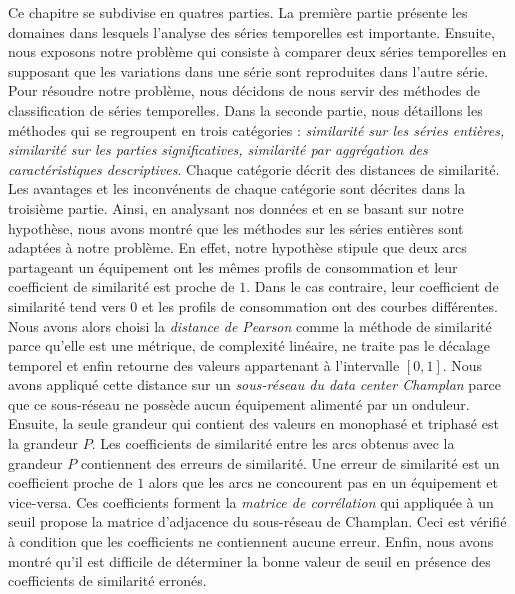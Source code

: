 Ce chapitre se subdivise en quatres parties.
La premi\`ere partie pr\'esente les domaines dans lesquels l'analyse des s\'eries temporelles est importante. Ensuite, nous exposons notre probl\`eme qui consiste \`a comparer deux s\'eries temporelles en supposant que les variations dans une s\'erie sont reproduites dans l'autre s\'erie.
Pour r\'esoudre notre probl\`eme, nous d\'ecidons de nous servir des m\'ethodes de classification de s\'eries temporelles.
Dans la seconde partie, nous d\'etaillons les m\'ethodes qui se regroupent en trois cat\'egories :
{\em similarit\'e sur les s\'eries enti\`eres, similarit\'e sur les parties significatives, similarit\'e par aggr\'egation des caract\'eristiques descriptives}. Chaque cat\'egorie d\'ecrit des distances de similarit\'e. 
Les avantages et les inconv\'enents de chaque cat\'egorie sont d\'ecrites dans la troisi\`eme partie. Ainsi, en analysant nos donn\'ees et en se basant sur notre hypoth\`ese, nous avons montr\'e que  les m\'ethodes sur les s\'eries enti\`eres sont adapt\'ees \`a notre probl\`eme.
En effet, notre hypoth\`ese stipule que deux arcs partageant un \'equipement ont les m\^emes profils de consommation et leur coefficient de similarit\'e est proche de $1$. Dans le cas contraire,  leur coefficient de similarit\'e tend vers $0$ et les profils de consommation ont des courbes diff\'erentes.
Nous avons alors choisi la {\em distance de Pearson} comme la m\'ethode de similarit\'e parce qu'elle est une m\'etrique, de complexit\'e lin\'eaire, ne traite pas le d\'ecalage temporel et enfin retourne des valeurs appartenant \`a l'intervalle $[0,1]$.
Nous avons appliqu\'e cette distance sur un {\em sous-r\'eseau du data center Champlan} parce que ce sous-r\'eseau ne poss\`ede aucun \'equipement aliment\'e par un onduleur.
Ensuite, la seule grandeur qui contient des valeurs en monophas\'e et triphas\'e est la grandeur $P$.
Les coefficients de similarit\'e entre les arcs obtenus avec la grandeur $P$ contiennent des erreurs de similarit\'e. Une erreur de similarit\'e est un coefficient proche de $1$ alors que les arcs ne concourent pas en un \'equipement et vice-versa.
Ces coefficients forment la {\em matrice de corr\'elation} qui appliqu\'ee \`a un seuil propose la matrice d'adjacence du sous-r\'eseau de Champlan. Ceci est v\'erifi\'e \`a condition que les coefficients ne contiennent aucune erreur.
Enfin, nous avons montr\'e qu'il est difficile de d\'eterminer la bonne valeur de seuil en pr\'esence des coefficients de similarit\'e erron\'es.